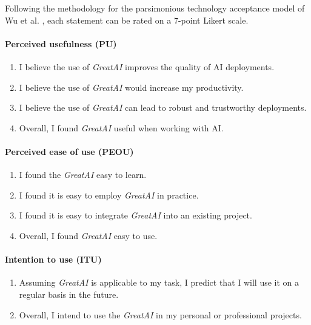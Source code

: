 Following the methodology for the parsimonious technology acceptance model of Wu et al. \cite{wu2011user}, each statement can be rated on a 7-point Likert scale.

\paragraph{Perceived usefulness (PU)}
\begin{enumerate}
 \item I believe the use of \textit{GreatAI} improves the quality of AI deployments.
 \item I believe the use of \textit{GreatAI} would increase my productivity.
 \item I believe the use of \textit{GreatAI} can lead to robust and trustworthy deployments.
 \item Overall, I found \textit{GreatAI} useful when working with AI.
\end{enumerate}

\paragraph{Perceived ease of use (PEOU)}
\begin{enumerate}
 \item I found the  \textit{GreatAI} easy to learn.
 \item I found it is easy to employ \textit{GreatAI} in practice.
 \item I found it is easy to integrate \textit{GreatAI} into an existing project.
 \item Overall, I found \textit{GreatAI} easy to use.
\end{enumerate}

\paragraph{Intention to use (ITU)}
\begin{enumerate}
 \item Assuming \textit{GreatAI} is applicable to my task, I predict that I will use it on a regular basis in the future.
 \item Overall, I intend to use the \textit{GreatAI} in my personal or professional projects.
\end{enumerate}


